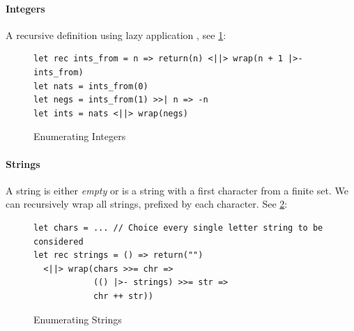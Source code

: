\paragraph{Integers} A recursive definition using lazy application \code{|>-}, see \cref{fig:Integers}:
\begin{figure}[h]
\begin{verbatim}
let rec ints_from = n => return(n) <||> wrap(n + 1 |>- ints_from)
let nats = ints_from(0)
let negs = ints_from(1) >>| n => -n
let ints = nats <||> wrap(negs) 
\end{verbatim}
\begin{subfigure}{0.45\textwidth}
\centering
{}
\caption{}
\end{subfigure}
\begin{subfigure}{0.45\textwidth}
\centering
\scalebox{0.8}{$\left[\ 0 \quad ; \quad \vcenter{\hbox{\begin{forest}
[$\cdot$ [$1$] [$\cdot$ [$2$] [$\cdot$ [$3$] [...]]]]
\end{forest}}} \quad ; \quad \vcenter{\hbox{\begin{forest}
[$\cdot$ [$-1$] [$\cdot$ [$-2$] [$\cdot$ [$-3$] [...]]]]
\end{forest}}}\right]$}
\caption{}
\end{subfigure}
\caption{Enumerating Integers}
\label{fig:Integers}
\end{figure}
 
\paragraph{Strings} A string is either \textit{empty} or is a string with a first character from a finite set. We can recursively wrap all strings, prefixed by each character. See \cref{fig:Strings}:
\begin{figure}[h]
\begin{verbatim}
let chars = ... // Choice every single letter string to be considered
let rec strings = () => return("") 
  <||> wrap(chars >>= chr => 
            (() |>- strings) >>= str => 
            chr ++ str)) 
\end{verbatim}
\caption{Enumerating Strings}
\label{fig:Strings}
\end{figure}
\

